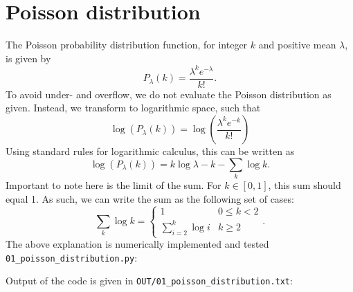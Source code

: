 \section{Poisson distribution}
The Poisson probability distribution function, for integer $k$ and positive mean $\lambda$, is given by
\begin{equation}
	P_\lambda(k) = \frac{\lambda^k e^{-\lambda}}{k!}.
\end{equation}
To avoid under- and overflow, we do not evaluate the Poisson distribution as given. Instead, we transform to logarithmic space, such that
\begin{equation}
	\log\left(P_\lambda(k)\right) = \log\left(\frac{\lambda^k e^{-k}}{k!}\right)
\end{equation}
Using standard rules for logarithmic calculus, this can be written as
\begin{equation}
	\log\left(P_\lambda(k)\right) = k\log{\lambda} - k - \sum_k \log{k}.
\end{equation}
Important to note here is the limit of the sum. For $k\in[0,1]$, this sum should equal 1. As such, we can write the sum as the following set of cases:
\begin{equation}
	\sum_k \log{k} = \begin{cases}
				1 & 0 \leq k < 2\\
				\sum_{i=2}^k \log{i} & k \geq 2
			 \end{cases}.
\end{equation}
The above explanation is numerically implemented and tested \texttt{01\_poisson\_distribution.py}:



Output of the code is given in \texttt{OUT/01\_poisson\_distribution.txt}:


